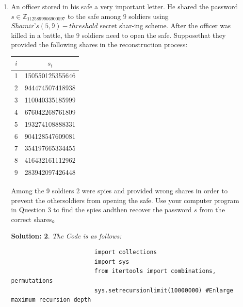 \documentclass{article}
\theoremstyle{break}
\newtheorem*{solution*}{\textbf{Solution:} }
\begin{document}
\begin{enumerate}
\begin{solution*}
\begin{lstlisting}
                        print(TSSS(1125899906900597, **d))                                           
                \end{lstlisting}
        And the Output is : 
        \[
                330836359559300
        \]
        \end{solution*}
        \newpage
        \item  An  officer  stored  in  his  safe  a  very  important  letter.    He  shared  the  password $s \in \mathbb{Z}_{1125899906900597}$ to  the  safe  among  $9$  soldiers  using  $Shamir’s  (5,9)-threshold$  secret  shar-ing scheme.  After the officer was killed in a battle, the $9$ soldiers need to open the safe.  Supposethat they provided the following shares in the reconstruction process:
        \begin{center}
                \begin{tabular}{|c|c|}
                        \hline
                        $i$ & $s_i$ \\
                        \hline
                        1 &  150550125355646 \\
                        \hline
                        2 &    944474507418938 \\
                        \hline
                        3 & 110040335185999 \\
                        \hline
                        4 & 676042268761809 \\
                        \hline
                        5 & 193274108888331 \\
                        \hline
                        6 & 904128547609081 \\
                        \hline
                        7 & 354197665334455 \\
                        \hline
                        8 & 416432161112962 \\
                        \hline
                        9 & 283942097426448 \\
                        \hline
                \end{tabular}
        \end{center}
        Among  the  9  soldiers  2  were  spies  and  provided  wrong  shares  in  order  to  prevent  the  othersoldiers from opening the safe.  Use your computer program in Question 3 to find the spies andthen recover the password $s$ from the correct shares。
        \vspace{10mm}
        \begin{solution*}
               The Code is as follows:\\
                \begin{lstlisting}
                        import collections
                        import sys
                        from itertools import combinations, permutations
                        sys.setrecursionlimit(10000000) #Enlarge maximum recursion depth 
                        

\end{lstlisting}
\end{solution*}
\end{enumerate}
\end{document}
